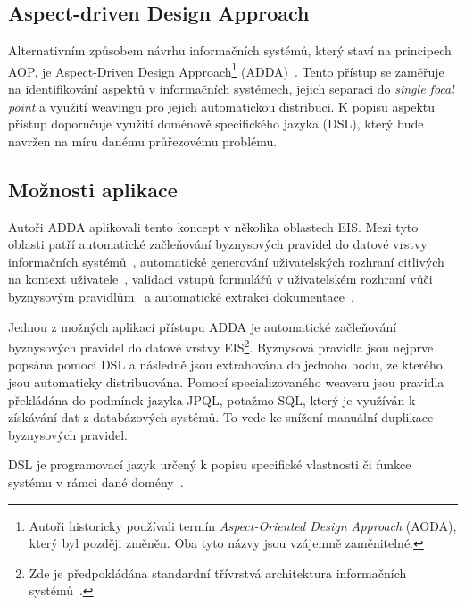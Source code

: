 \subsection{Aspect-driven Design Approach}\label{sec:adda}

Alternativním způsobem návrhu informačních systémů, který staví na principech \gls{AOP},
je Aspect-Driven Design Approach\footnote{Autoři historicky používali termín \textit{Aspect-Oriented
Design Approach} (AODA), který byl později změněn. Oba tyto názvy jsou vzájemně zaměnitelné.}
(\gls{ADDA})~\cite{cemus2014aspect}. Tento přístup se zaměřuje na identifikování aspektů v informačních systémech,
jejich separaci do \textit{single focal point} a využití weavingu pro jejich automatickou distribuci.
K popisu aspektu přístup doporučuje využití doménově specifického jazyka (\gls{DSL}), který bude navržen na
míru danému průřezovému problému.

\subsection{Možnosti aplikace}

Autoři \gls{ADDA} aplikovali tento koncept v několika oblastech \gls{EIS}.
Mezi tyto oblasti patří automatické začleňování byznysových pravidel
do datové vrstvy informačních systémů~\cite{cemus2015automated}, automatické
generování uživatelských rozhraní citlivých na kontext uživatele~\cite{cemus2017separation},
validaci vstupů formulářů v uživatelském rozhraní vůči byznysovým pravidlům~\cite{cemus2016context, cemus2017separation}
a automatické extrakci dokumentace~\cite{cemus2017automated}.

Jednou z možných aplikací přístupu \gls{ADDA} je automatické začleňování
byznysových pravidel do datové vrstvy \gls{EIS}\footnote{Zde je předpokládána standardní
třívrstvá architektura informačních systémů~\cite{fowler2002patterns}.}.
Byznysová pravidla jsou nejprve popsána pomocí \gls{DSL} a následně jsou
extrahována do jednoho bodu, ze kterého jsou automaticky distribuována.
Pomocí specializovaného weaveru jsou pravidla překládána do podmínek
jazyka \gls{JPQL}, potažmo \gls{SQL}, který je využíván k získávání dat
z databázových systémů. To vede ke snížení manuální duplikace byznysových
pravidel.

\begin{definition}
    \gls{DSL} je programovací jazyk určený k popisu specifické vlastnosti či funkce systému v
    rámci dané domény~\cite{fowler2010domain}.
\end{definition}

